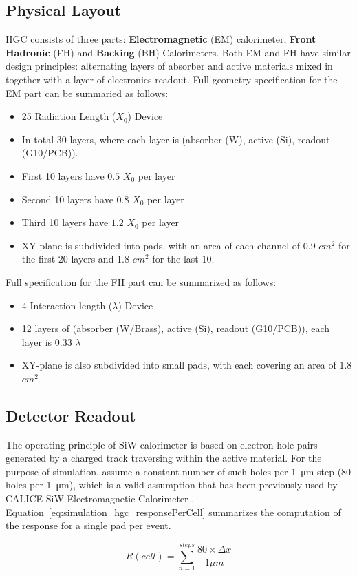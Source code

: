 \subsection{Physical Layout}
HGC consists of three parts: \textbf{Electromagnetic} (EM) calorimeter, \textbf{Front Hadronic} (FH) and \textbf{Backing} (BH) Calorimeters. Both EM and FH have similar design principles: alternating layers of absorber and active materials mixed in together with a layer of electronics readout. Full geometry specification for the EM part can be summaried as follows:
\begin{itemize}
    \item 25 Radiation Length ($X_{0}$) Device
    \item In total 30 layers, where each layer is (absorber (W), active (Si), readout (G10/PCB)).
    \item First 10 layers have $0.5$ $X_{0}$ per layer
    \item Second 10 layers have $0.8$ $X_{0}$ per layer
    \item Third 10 layers have $1.2$ $X_{0}$ per layer
    \item XY-plane is subdivided into pads, with an area of each channel of 0.9 $cm^2$ for the first 20 layers and 1.8 $cm^2$ for the last 10.
\end{itemize}
Full specification for the FH part can be summarized as follows:
\begin{itemize}
    \item 4 Interaction length ($\lambda$) Device
    \item 12 layers of (absorber (W/Brass), active (Si), readout (G10/PCB)), each layer is $0.33$ $\lambda$
    \item XY-plane is also subdivided into small pads, with each covering an area of 1.8 $cm^2$
\end{itemize}

\subsection{Detector Readout} \label{subsection:simulations_hgc_readout}
The operating principle of SiW calorimeter is based on electron-hole pairs generated by a charged track traversing within the active material. For the purpose of simulation, assume a constant number of such holes per \SI{1}{\micro\metre} step (80 holes per \SI{1}{\micro\metre}), which is a valid assumption that has been previously used by {\sc CALICE} SiW Electromagnetic Calorimeter \cite{Adloff:2008aa}. Equation~\ref{eq:simulation_hgc_responsePerCell} summarizes the computation of the response for a single pad per event.
\begin{center}
    \begin{equation}
        \label{eq:simulation_hgc_responsePerCell}
        {R(cell)} = {\sum_{n=1}^{steps} \frac{80\times \Delta x}{1\mu m}}
   \end{equation}
\end{center}

